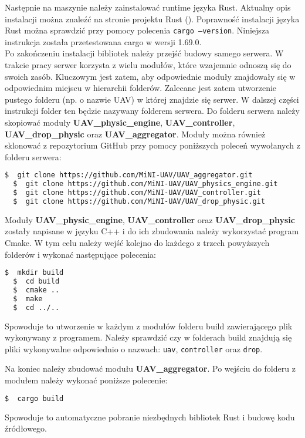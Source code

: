 Następnie na maszynie należy zainstalować runtime języka Rust. Aktualny opis instalacji można znaleźć na stronie projektu Rust (\cite{rust_getting_started}). Poprawność instalacji języka Rust można sprawdzić przy pomocy polecenia \texttt{cargo --version}. Niniejsza instrukcja została przetestowana cargo w wersji 1.69.0.\\
 
Po zakończeniu instalacji bibliotek należy przejść budowy samego serwera. W trakcie pracy serwer korzysta z wielu modułów, które wzajemnie odnoszą się do swoich zasób. Kluczowym jest zatem, aby odpowiednie moduły znajdowały się w odpowiednim miejscu w hierarchii folderów. Zalecane jest zatem utworzenie pustego folderu (np. o nazwie UAV) w której znajdzie się serwer. W dalszej części instrukcji folder ten będzie nazywany folderem serwera. Do folderu serwera należy skopiować moduły \textbf{UAV\_physic\_engine}, \textbf{UAV\_controller}, \textbf{UAV\_drop\_physic} oraz \textbf{UAV\_aggregator}. Moduły można również sklonować z repozytorium GitHub przy pomocy poniższych poleceń wywołanych z folderu serwera:
\begin{lstlisting}[language=bash]
  $  git clone https://github.com/MiNI-UAV/UAV_aggregator.git 
  $  git clone https://github.com/MiNI-UAV/UAV_physics_engine.git
  $  git clone https://github.com/MiNI-UAV/UAV_controller.git
  $  git clone https://github.com/MiNI-UAV/UAV_drop_physic.git
\end{lstlisting}

Moduły \textbf{UAV\_physic\_engine}, \textbf{UAV\_controller} oraz \textbf{UAV\_drop\_physic} zostały napisane w języku C++ i do ich zbudowania należy wykorzystać program Cmake. W tym celu należy wejść kolejno do każdego z trzech powyższych folderów i wykonać następujące polecenia:
\begin{lstlisting}[language=bash]
  $  mkdir build
  $  cd build
  $  cmake ..
  $  make
  $  cd ../..
\end{lstlisting}
Spowoduje to utworzenie w każdym z modułów folderu build zawierającego plik wykonywany z programem. Należy sprawdzić czy w folderach build znajdują się pliki wykonywalne odpowiednio o nazwach: \texttt{uav}, \texttt{controller} oraz \texttt{drop}.

Na koniec należy zbudować modułu \textbf{UAV\_aggregator}. Po wejściu do folderu z modułem należy wykonać poniższe polecenie:
\begin{lstlisting}[language=bash]
  $  cargo build
\end{lstlisting}
Spowoduje to automatyczne pobranie niezbędnych bibliotek Rust i budowę kodu źródłowego.\\

